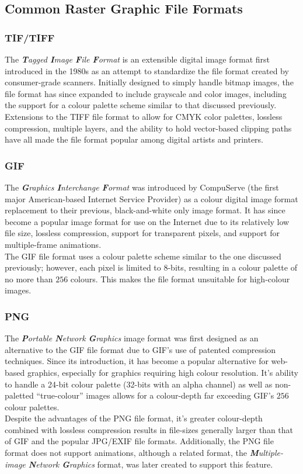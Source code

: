     \subsection{Common Raster Graphic File Formats}
      \subsubsection{TIF/TIFF}
        The \emph{\textbf{T}agged \textbf{I}mage \textbf{F}ile \textbf{F}ormat} is an extensible digital image format first introduced in the 1980s as an attempt to standardize the file format created by consumer-grade scanners. Initially designed to simply handle bitmap images, the file format has since expanded to include grayscale and color images, including the support for a colour palette scheme similar to that discussed previously.\\[\baselineskip]
        Extensions to the TIFF file format to allow for CMYK color palettes, lossless compression, multiple layers, and the ability to hold vector-based clipping paths have all made the file format popular among digital artists and printers. 
      \subsubsection{GIF}
        The \emph{\textbf{G}raphics \textbf{I}nterchange \textbf{F}ormat} was introduced by CompuServe (the first major American-based Internet Service Provider) as a colour digital image format replacement to their previous, black-and-white only image format. It has since become a popular image format for use on the Internet due to its relatively low file size, lossless compression, support for transparent pixels, and support for multiple-frame animations.\\[\baselineskip]
        The GIF file format uses a colour palette scheme similar to the one discussed previously; however, each pixel is limited to 8-bits, resulting in a colour palette of no more than $256$ colours. This makes the file format unsuitable for high-colour images.
      \subsubsection{PNG}
        The \emph{\textbf{P}ortable \textbf{N}etwork \textbf{G}raphics} image format was first designed as an alternative to the GIF file format due to GIF's use of patented compression techniques. Since its introduction, it has become a popular alternative for web-based graphics, especially for graphics requiring high colour resolution. It's ability to handle a 24-bit colour palette (32-bits with an alpha channel) as well as non-paletted ``true-colour'' images allows for a colour-depth far exceeding GIF's $256$ colour palettes.\\[\baselineskip]
        Despite the advantages of the PNG file format, it's greater colour-depth combined with lossless compression results in file-sizes generally larger than that of GIF and the popular JPG/EXIF file formats. Additionally, the PNG file format does not support animations, although a related format, the \emph{\textbf{M}ultiple-image \textbf{N}etwork \textbf{G}raphics} format, was later created to support this feature.
